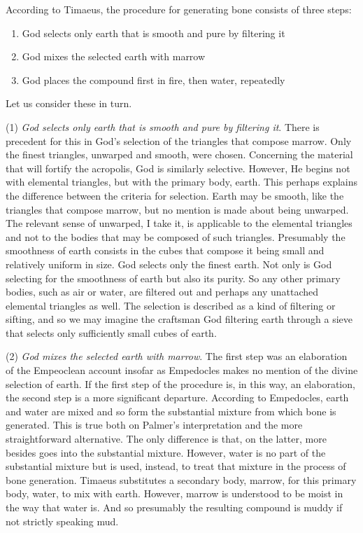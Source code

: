 According to Timaeus, the procedure for generating bone consists of three steps:
\begin{enumerate}[(1)]
	\item God selects only earth that is smooth and pure by filtering it
	\item God mixes the selected earth with marrow
	\item God places the compound first in fire, then water, repeatedly
\end{enumerate}
Let us consider these in turn.

(1) \emph{God selects only earth that is smooth and pure by filtering it}. There is precedent for this in God's selection of the triangles that compose marrow. Only the finest triangles, unwarped and smooth, were chosen. Concerning the material that will fortify the acropolis, God is similarly selective. However, He begins not with elemental triangles, but with the primary body, earth. This perhaps explains the difference between the criteria for selection. Earth may be smooth, like the triangles that compose marrow, but no mention is made about being unwarped. The relevant sense of unwarped, I take it, is applicable to the elemental triangles and not to the bodies that may be composed of such triangles. Presumably the smoothness of earth consists in the cubes that compose it being small and relatively uniform in size. God selects only the finest earth. Not only is God selecting for the smoothness of earth but also its purity. So any other primary bodies, such as air or water, are filtered out and perhaps any unattached elemental triangles as well. The selection is described as a kind of filtering or sifting, and so we may imagine the craftsman God filtering earth through a sieve that selects only sufficiently small cubes of earth.

(2) \emph{God mixes the selected earth with marrow}. The first step was an elaboration of the Empeoclean account insofar as Empedocles makes no mention of the divine selection of earth. If the first step of the procedure is, in this way, an elaboration, the second step is a more significant departure. According to Empedocles, earth and water are mixed and so form the substantial mixture from which bone is generated. This is true both on Palmer's \citeyearpar{Palmer:2009qf} interpretation and the more straightforward alternative. The only difference is that, on the latter, more besides goes into the substantial mixture. However, water is no part of the substantial mixture but is used, instead, to treat that mixture in the process of bone generation. Timaeus substitutes a secondary body, marrow, for this primary body, water, to mix with earth. However, marrow is understood to be moist in the way that water is. And so presumably the resulting compound is muddy if not strictly speaking mud.

